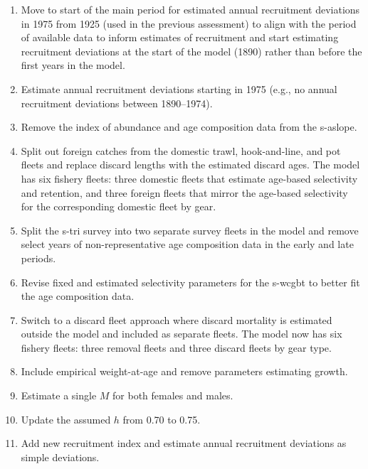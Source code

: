 \documentclass[
  english,
]{article}
\begin{document}
\begin{enumerate}
\item Move to start of the main period for estimated annual recruitment deviations in 1975 from 1925 (used in the previous assessment) to align with the period of available data to inform estimates of recruitment and start estimating recruitment deviations at the start of the model (1890) rather than before the first years in the model.
\item Estimate annual recruitment deviations starting in 1975 (e.g., no annual recruitment deviations between 1890--1974).
\item Remove the index of abundance and age composition data from the \gls{s-aslope}.
\item Split out foreign catches from the domestic trawl, hook-and-line, and pot fleets and replace discard lengths with the estimated discard ages. The model has six fishery fleets: three domestic fleets that estimate age-based selectivity and retention, and three foreign fleets that mirror the age-based selectivity for the corresponding domestic fleet by gear.
\item Split the \gls{s-tri} survey into two separate survey fleets in the model and remove select years of non-representative age composition data in the early and late periods.
\item Revise fixed and estimated selectivity parameters for the \gls{s-wcgbt} to better fit the age composition data.
\item Switch to a discard fleet approach where discard mortality is estimated outside the model and included as separate fleets. The model now has six fishery fleets: three removal fleets and three discard fleets by gear type.
\item Include empirical weight-at-age and remove parameters estimating growth.
\item Estimate a single $M$ for both females and males.
\item Update the assumed $h$ from 0.70 to 0.75.
\item Add new recruitment index and estimate annual recruitment deviations as simple deviations.
\end{enumerate}
\end{document}
